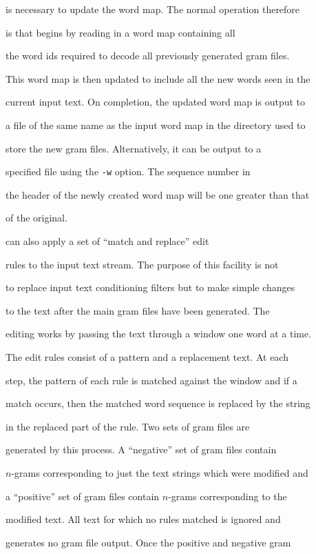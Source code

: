 is necessary to update the word map.  The normal operation therefore


is that  begins by reading in a word map containing all


the word ids required to decode all previously generated gram files.


This word map is then updated to include all the new words seen in the


current input text.  On completion, the updated word map is output to


a file of the same name as the input word map in the directory used to


store the new gram files.  Alternatively, it can be output to a


specified file using the \texttt{-w} option.  The sequence number in


the header of the newly created word map will be one greater than that


of the original.





 can also apply a set of ``match and replace'' edit 


rules to the input text stream.  The purpose of this facility is not


to replace input text conditioning filters but to make simple changes


to the text after the main gram files have been generated.  The


editing works by passing the text through a window one word at a time.


The edit rules consist of a pattern and a replacement text. At each


step, the pattern of each rule is matched against the window and if a


match occurs, then the matched word sequence is replaced by the string


in the replaced part of the rule.  Two sets of gram files are


generated by this process.  A ``negative'' set of gram files contain


$n$-grams corresponding to just the text strings which were modified and


a ``positive'' set of gram files contain $n$-grams corresponding to the


modified text.  All text for which no rules matched is ignored and


generates no gram file output.  Once the positive and negative gram


